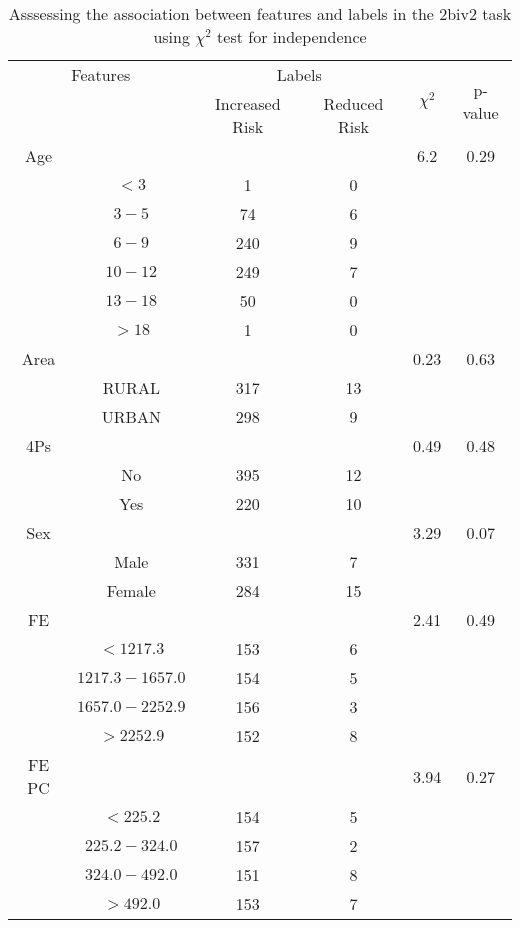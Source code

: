 \begin{table}[!htb]
\centering
\caption{Asssessing the association between features and labels in the 2biv2 task using $\chi^2$ test for independence}
\label{tab:chitest_2biv2}
\begin{tabular}{c c | c c| c | c}
\hline
\multicolumn{2}{c|}{Features}& \multicolumn{2}{c|}{Labels}& \multirow{2}{*}{$\chi^2$} & \multirow{2}{*}{p-value}\\ 
& & Increased Risk & Reduced Risk & & \\ 
\hline
Age &  &  & & 6.2 & 0.29 \\ 
& $< 3$ & 1 & 0& & \\ 
& $3-5$ & 74 & 6& & \\ 
& $6-9$ & 240 & 9& & \\ 
& $10-12$ & 249 & 7& & \\ 
& $13-18$ & 50 & 0& & \\ 
& $> 18$ & 1 & 0& & \\ 
\hline 
Area &  &  & & 0.23 & 0.63 \\ 
& RURAL & 317 & 13& & \\ 
& URBAN & 298 & 9& & \\ 
\hline 
4Ps &  &  & & 0.49 & 0.48 \\ 
& No & 395 & 12& & \\ 
& Yes & 220 & 10& & \\ 
\hline 
Sex &  &  & & 3.29 & 0.07 \\ 
& Male & 331 & 7& & \\ 
& Female & 284 & 15& & \\ 
\hline 
FE &  &  & & 2.41 & 0.49 \\ 
& $< 1217.3$ & 153 & 6& & \\ 
& $1217.3-1657.0$ & 154 & 5& & \\ 
& $1657.0-2252.9$ & 156 & 3& & \\ 
& $> 2252.9$ & 152 & 8& & \\ 
\hline 
FE PC &  &  & & 3.94 & 0.27 \\ 
& $< 225.2$ & 154 & 5& & \\ 
& $225.2-324.0$ & 157 & 2& & \\ 
& $324.0-492.0$ & 151 & 8& & \\ 
& $> 492.0$ & 153 & 7& & \\ 
\hline 
\end{tabular}
\end{table}
